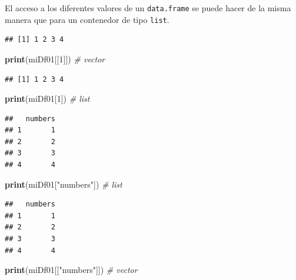 \documentclass[]{book}
\newenvironment{Shaded}{\begin{snugshade}}{\end{snugshade}}
\newcommand{\KeywordTok}[1]{\textcolor[rgb]{0.13,0.29,0.53}{\textbf{#1}}}
\newcommand{\DecValTok}[1]{\textcolor[rgb]{0.00,0.00,0.81}{#1}}
\newcommand{\StringTok}[1]{\textcolor[rgb]{0.31,0.60,0.02}{#1}}
\newcommand{\CommentTok}[1]{\textcolor[rgb]{0.56,0.35,0.01}{\textit{#1}}}
\newcommand{\OperatorTok}[1]{\textcolor[rgb]{0.81,0.36,0.00}{\textbf{#1}}}
\newcommand{\NormalTok}[1]{#1}
\begin{document}
El acceso a los diferentes valores de un \texttt{data.frame} se puede
hacer de la misma manera que para un contenedor de tipo \texttt{list}.

\begin{Shaded}
\end{Shaded}

\begin{verbatim}
## [1] 1 2 3 4
\end{verbatim}

\begin{Shaded}
\begin{Highlighting}[]
\KeywordTok{print}\NormalTok{(miDf01[[}\DecValTok{1}\NormalTok{]]) }\CommentTok{# vector}
\end{Highlighting}
\end{Shaded}

\begin{verbatim}
## [1] 1 2 3 4
\end{verbatim}

\begin{Shaded}
\begin{Highlighting}[]
\KeywordTok{print}\NormalTok{(miDf01[}\DecValTok{1}\NormalTok{]) }\CommentTok{# list}
\end{Highlighting}
\end{Shaded}

\begin{verbatim}
##   numbers
## 1       1
## 2       2
## 3       3
## 4       4
\end{verbatim}

\begin{Shaded}
\begin{Highlighting}[]
\KeywordTok{print}\NormalTok{(miDf01[}\StringTok{"numbers"}\NormalTok{]) }\CommentTok{# list}
\end{Highlighting}
\end{Shaded}

\begin{verbatim}
##   numbers
## 1       1
## 2       2
## 3       3
## 4       4
\end{verbatim}

\begin{Shaded}
\begin{Highlighting}[]
\KeywordTok{print}\NormalTok{(miDf01[[}\StringTok{"numbers"}\NormalTok{]]) }\CommentTok{# vector}
\end{Highlighting}
\end{Shaded}
\end{document}
